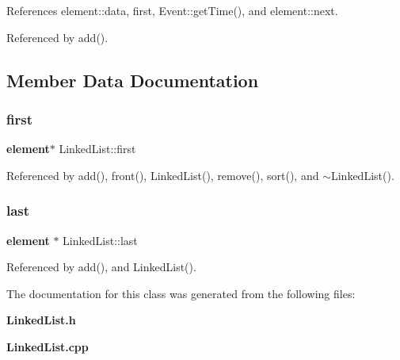 References element\+::data, first, Event\+::get\+Time(), and element\+::next.



Referenced by add().



\subsection{Member Data Documentation}
\mbox{\label{classLinkedList_ab574722e2886869ffd946970cf60da6d}} 
\subsubsection{first}
{\footnotesize\ttfamily \textbf{ element}$\ast$ Linked\+List\+::first}



Referenced by add(), front(), Linked\+List(), remove(), sort(), and $\sim$\+Linked\+List().

\mbox{\label{classLinkedList_a60371ee550bb97f3904c6d37fc9b4ef5}} 
\subsubsection{last}
{\footnotesize\ttfamily \textbf{ element} $\ast$ Linked\+List\+::last}



Referenced by add(), and Linked\+List().



The documentation for this class was generated from the following files\+:\begin{DoxyCompactItemize}
\item 
\textbf{ Linked\+List.\+h}\item 
\textbf{ Linked\+List.\+cpp}\end{DoxyCompactItemize}

